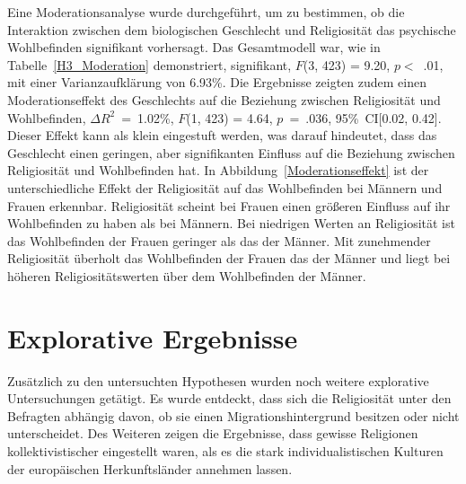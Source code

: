 
Eine Moderationsanalyse wurde durchgeführt, um zu bestimmen, ob die Interaktion zwischen dem biologischen Geschlecht und Religiosität das psychische Wohlbefinden signifikant vorhersagt. Das Gesamtmodell war, wie in Tabelle~\ref{H3_Moderation} demonstriert, signifikant, $F$(3, 423) = 9.20, $p<$~.01, mit einer Varianzaufklärung von 6.93\%. Die Ergebnisse zeigten zudem einen Moderationseffekt des Geschlechts auf die Beziehung zwischen Religiosität und Wohlbefinden, $\Delta R^{2}$~=~1.02\%, $F$(1, 423) = 4.64, $p$~=~.036, 95\%~CI[0.02, 0.42]. Dieser Effekt kann als klein eingestuft werden, was darauf hindeutet, dass das Geschlecht einen geringen, aber signifikanten Einfluss auf die Beziehung zwischen Religiosität und Wohlbefinden hat. In Abbildung~\ref{Moderationseffekt} ist der unterschiedliche Effekt der Religiosität auf das Wohlbefinden bei Männern und Frauen erkennbar. Religiosität scheint bei Frauen einen größeren Einfluss auf ihr Wohlbefinden zu haben als bei Männern. Bei niedrigen Werten an Religiosität ist das Wohlbefinden der Frauen geringer als das der Männer. Mit zunehmender Religiosität überholt das Wohlbefinden der Frauen das der Männer und liegt bei höheren Religiositätswerten über dem Wohlbefinden der Männer.











\section{Explorative Ergebnisse}    \label{sec_4.3}
Zusätzlich zu den untersuchten Hypothesen wurden noch weitere explorative Untersuchungen getätigt. Es wurde entdeckt, dass sich die Religiosität unter den Befragten abhängig davon, ob sie einen Migrationshintergrund besitzen oder nicht unterscheidet. Des Weiteren zeigen die Ergebnisse, dass gewisse Religionen kollektivistischer eingestellt waren, als es die stark individualistischen Kulturen der europäischen Herkunftsländer annehmen lassen. 



